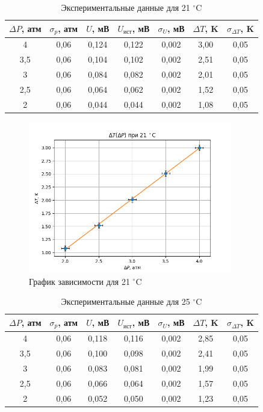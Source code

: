 \documentclass[a4paper,12pt]{article}
\begin{document}
\begin{table}[!ht]
    \centering
    \begin{tabular}{|c|c|c|c|c|c|c|}
    \hline
        $ \Delta P $, атм & $ \sigma_p $, атм & $ U $, мВ & $ U_{ист} $, мВ &$ \sigma_U $, мВ & $ \Delta T $, K & $ \sigma_{\Delta T} $, K \\ \hline
        4 & 0,06 & 0,124 & 0,122 & 0,002 & 3,00 & 0,05  \\ \hline
        3,5 & 0,06 & 0,104 & 0,102 & 0,002 & 2,51 & 0,05  \\ \hline
        3 & 0,06 & 0,084 & 0,082 & 0,002 & 2,01 & 0,05  \\ \hline
        2,5 & 0,06 & 0,064 & 0,062 & 0,002 & 1,52 & 0,05  \\ \hline
        2 & 0,06 & 0,044 & 0,044 & 0,002 & 1,08 & 0,05 \\ \hline
    \end{tabular}
    \caption{Экспериментальные данные для 21 $^\circ$C}
\end{table}

\begin{figure}[H]
    \centering
    \includegraphics[width=0.79\textwidth]{1.png}
    \caption{График зависимости для 21 $^\circ$C}
\end{figure}

\begin{table}[!ht]
    \centering
    \begin{tabular}{|c|c|c|c|c|c|c|}
    \hline
        $ \Delta P $, атм & $ \sigma_p $, атм & $ U $, мВ & $ U_{ист} $, мВ &$ \sigma_U $, мВ & $ \Delta T $, K & $ \sigma_{\Delta T} $, K \\ \hline
        4 & 0,06 & 0,118 & 0,116 & 0,002 & 2,85 & 0,05  \\ \hline
        3,5 & 0,06 & 0,100 & 0,098 & 0,002 & 2,41 & 0,05  \\ \hline
        3 & 0,06 & 0,083 & 0,081 & 0,002 & 1,99 & 0,05  \\ \hline
        2,5 & 0,06 & 0,066 & 0,064 & 0,002 & 1,57 & 0,05  \\ \hline
        2 & 0,06 & 0,052 & 0,050 & 0,002 & 1,23 & 0,05 \\ \hline
    \end{tabular}
    \caption{Экспериментальные данные для 25 $^\circ$C}
\end{table}
\end{document}

